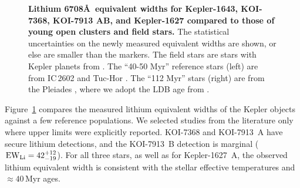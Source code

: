 \documentclass[12pt,twocolumn,linenumbers]{aastex63}
\begin{document}
\begin{figure}[tp]
	\begin{center}
		\leavevmode
	\end{center}
	\vspace{-0.3cm}
	\caption{
    {\bf Lithium 6708\AA\ equivalent widths for Kepler-1643, KOI-7368,
    KOI-7913 AB, and Kepler-1627 compared to those of young open
    clusters and field stars. }
    The statistical uncertainties on the newly measured equivalent
    widths are shown, or else are smaller than the markers.
    The field stars are stars with Kepler planets from \citet{berger_identifying_2018}.
    The ``40-50 Myr'' reference stars (left) are from
		IC\,2602 \citep{randich_gaiaeso_2018} and Tuc-Hor
		\citep{kraus_stellar_2014}.
    The ``112 Myr'' stars (right) are from the Pleiades
    \citep{soderblom_evolution_1993,jones_evolution_1996,bouvier_pleiades_lirot_2018},
    where we adopt the LDB age from \citet{dahm_2015}.
    \label{fig:lithium}
	}
\end{figure}

Figure~\ref{fig:lithium} compares the measured lithium equivalent
widths of the Kepler objects against a few reference populations.
We selected studies from the literature only where
upper limits were explicitly reported.  KOI-7368 and
KOI-7913~A have secure lithium detections, and the KOI-7913~B
detection is marginal (${\rm EW}_{\rm Li} = 42^{+12}_{-19}$).  For all
three stars, as well as for Kepler-1627~A, the observed lithium
equivalent width is consistent with the stellar effective temperatures
and $\approx40$\,Myr ages.
\end{document}
